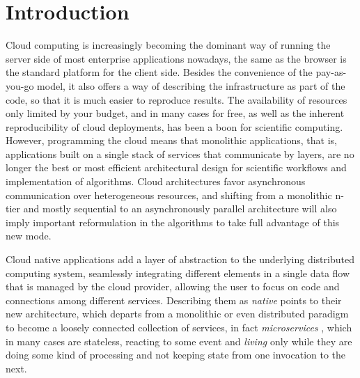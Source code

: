 \documentclass[sigconf]{acmart}
\begin{document}




\maketitle

\section{Introduction}

Cloud computing is increasingly becoming the dominant way of running
the server side of most enterprise applications nowadays, the same as the browser is
the standard platform for the client side. Besides the convenience of the pay-as-you-go
model, it also offers a way of describing the infrastructure as part
of the code, so that it is much easier to reproduce results.
The availability of resources only limited by your budget, and in many
cases for free, as well as the inherent reproducibility of cloud
deployments, has been a boon for scientific computing. However,
programming the cloud means that monolithic applications, that is,
applications built on a single stack of services that communicate by
layers, are no longer the best or most efficient architectural design
for scientific workflows and implementation of algorithms. Cloud
architectures favor asynchronous communication over heterogeneous %
resources, and shifting from a monolithic n-tier and mostly sequential
to an asynchronously parallel architecture will also imply important
reformulation in the algorithms to take full advantage of this new
mode.

  Cloud native applications add a layer of abstraction to the
  underlying distributed computing system, seamlessly integrating
  different elements in a single data flow that is managed by the
  cloud provider, allowing the user to focus on code and connections
  among different services. Describing them as {\em native} points
  to their new architecture, which departs from a monolithic or even
  distributed paradigm to become a loosely connected collection of
services, in fact {\em microservices} \cite{microservices}, which in
 many cases are stateless, reacting to some event and
  {\em living} only while they are doing some kind of processing and
  not keeping state from one invocation to the next.
\end{document}
